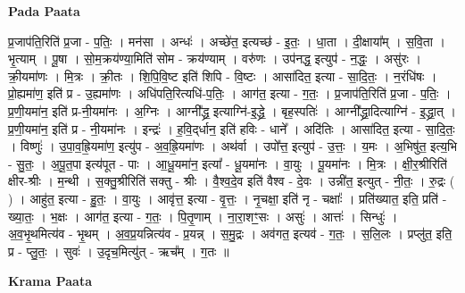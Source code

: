 \documentclass[17pt]{extarticle}
\begin{document}
\textbf{Pada Paata} \newline

प्र॒जाप॑ति॒रिति॑ प्र॒जा - प॒तिः॒ । मन॑सा । अन्धः॑ । अच्छे॑त॒ इत्यच्छ॑ - इ॒तः॒ । धा॒ता । दी॒क्षाया᳚म् । स॒वि॒ता । भृ॒त्याम् । पू॒षा । सो॒म॒क्रय॑ण्या॒मिति॑ सोम - क्रय॑ण्याम् । वरु॑णः । उप॑नद्ध॒ इत्युप॑ - न॒द्धः॒ । असु॑रः । क्री॒यमा॑णः । मि॒त्रः । क्री॒तः । शि॒पि॒वि॒ष्ट इति॑ शिपि - वि॒ष्टः । आसा॑दित॒ इत्या - सा॒दि॒तः॒ । न॒रंधि॑षः । प्रो॒ह्यमा॑ण॒ इति॑ प्र - उ॒ह्यमा॑णः । अधि॑पति॒रित्यधि॑-प॒तिः॒ । आग॑त॒ इत्या - ग॒तः॒ । प्र॒जाप॑ति॒रिति॑ प्र॒जा - प॒तिः॒ । प्र॒णी॒यमा॑न॒ इति॑ प्र-नी॒यमा॑नः । अ॒ग्निः । आग्नी᳚द्ध्र॒ इत्याग्नि॑-इ॒द्ध्रे॒ । बृह॒स्पतिः॑ । आग्नी᳚द्ध्रा॒दित्याग्नि॑ - इ॒द्ध्रा॒त् । प्र॒णी॒यमा॑न॒ इति॑ प्र - नी॒यमा॑नः । इन्द्रः॑ । ह॒वि॒द्‌र्धान॒ इति॑ हविः - धाने᳚ । अदि॑तिः । आसा॑दित॒ इत्या - सा॒दि॒तः॒ । विष्णुः॑ । उ॒पा॒व॒ह्रि॒यमा॑ण॒ इत्यु॑प - अ॒व॒ह्रि॒यमा॑णः । अथ॑र्वा । उपो᳚त्त॒ इत्युप॑ - उ॒त्तः॒ । य॒मः । अ॒भिषु॑त॒ इत्य॒भि - सु॒तः॒ । अ॒पू॒त॒पा इत्य॑पूत - पाः । आ॒धू॒यमा॑न॒ इत्या᳚ - धू॒यमा॑नः । वा॒युः । पू॒यमा॑नः । मि॒त्रः । क्षी॒र॒श्रीरिति॑ क्षीर-श्रीः । म॒न्थी । स॒क्तु॒श्रीरिति॑ सक्तु - श्रीः । वै॒श्व॒दे॒व इति॑ वैश्व - दे॒वः । उन्नी॑त॒ इत्युत् - नी॒तः॒ । रु॒द्रः ( ) । आहु॑त॒ इत्या - हु॒तः॒ । वा॒युः । आवृ॑त्त॒ इत्या - वृ॒त्तः॒ । नृ॒चक्षा॒ इति॑ नृ - चक्षाः᳚ । प्रति॑ख्यात॒ इति॒ प्रति॑ - ख्या॒तः॒ । भ॒क्षः । आग॑त॒ इत्या - ग॒तः॒ । पि॒तृ॒णाम् । ना॒रा॒शꣳ॒॒सः । असुः॑ । आत्तः॑ । सिन्धुः॑ । अ॒व॒भृ॒थमित्य॑व - भृ॒थम् । अ॒व॒प्र॒यन्नित्य॑व - प्र॒यन्न् । स॒मु॒द्रः । अव॑गत॒ इत्यव॑ - ग॒तः॒ । स॒लि॒लः । प्रप्लु॑त॒ इति॒ प्र - प्लु॒तः॒ । सुवः॑ । उ॒दृच॒मित्यु॑त् - ऋच᳚म् । ग॒तः ॥  \newline


\textbf{Krama Paata} \newline
\end{document}
